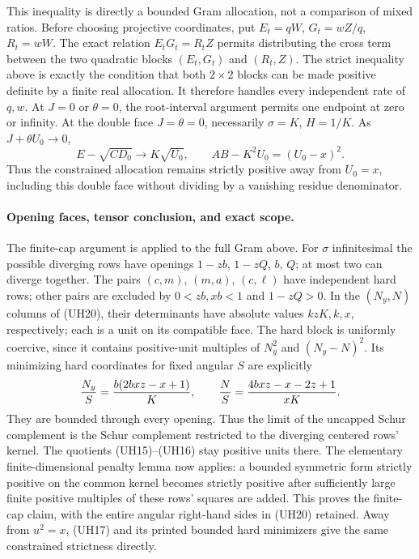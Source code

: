 This inequality is directly a bounded Gram allocation, not a
comparison of mixed ratios. Before choosing projective coordinates,
put $E_t=qW$, $G_t=wZ/q$, $R_t=wW$. The exact relation
$E_tG_t=R_tZ$ permits distributing the cross term between the two
quadratic blocks $(E_t,G_t)$ and $(R_t,Z)$. The strict inequality
above is exactly the condition that both $2\times2$ blocks can be
made positive definite by a finite real allocation. It therefore
handles every independent rate of $q,w$.
At $J=0$ or $\theta=0$, the root-interval argument permits one endpoint
at zero or infinity. At the double face $J=\theta=0$, necessarily
$\sigma=K$, $H=1/K$. As $J+\theta U_0\to0$,
\[
 E-\sqrt{CD_0}\longrightarrow K\sqrt{U_0},\qquad
 AB-K^2U_0=(U_0-x)^2.
\]
Thus the constrained allocation remains strictly positive away from
$U_0=x$, including this double face without dividing by a vanishing
residue denominator.

\paragraph{Opening faces, tensor conclusion, and exact scope.}
The finite-cap argument is applied to the full Gram above. For
$\sigma$ infinitesimal the possible diverging rows have openings
$1-zb$, $1-zQ$, $b$, $Q$; at most two can diverge together. The pairs
$(c,m)$, $(m,a)$, $(c,\ell)$ have independent hard rows; other pairs
are excluded by $0<zb,xb<1$ and $1-zQ>0$. In the $(N_y,N)$ columns
of (UH20), their determinants have absolute values $kzK,k,x$,
respectively; each is a unit on its compatible face. The hard block
is uniformly coercive, since it contains positive-unit multiples
of $N_y^2$ and $(N_y-N)^2$. Its minimizing hard coordinates for
fixed angular $S$ are explicitly
\[
 {N_y\over S}={b(2bxz-x+1)\over K},\qquad
 {N\over S}={4bxz-x-2z+1\over xK}.
\]
They are bounded through every opening. Thus the limit of the
uncapped Schur complement is the Schur complement restricted to the
diverging centered rows' kernel. The quotients (UH15)--(UH16) stay
positive units there. The elementary finite-dimensional penalty
lemma now applies: a bounded symmetric form strictly positive on
the common kernel becomes strictly positive after sufficiently large
finite positive multiples of these rows' squares are added. This
proves the finite-cap claim, with the entire angular right-hand sides
in (UH20) retained. Away from $u^2=x$, (UH17) and its printed bounded
hard minimizers give the same constrained strictness directly.

